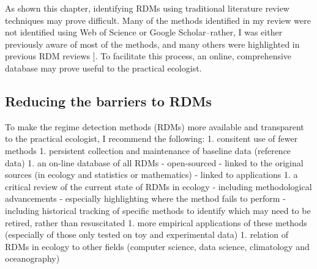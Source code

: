 \documentclass[12pt,twoside,openany]{reedthesis}
\begin{document}
As shown this chapter, identifying RDMs using traditional literature review techniques may prove difficult. Many of the methods identified in my review were not identified using Web of Science or Google Scholar--rather, I was either previously aware of most of the methods, and many others were highlighted in previous RDM reviews {]}. To facilitate this process, an online, comprehensive database may prove useful to the practical ecologist.

\hypertarget{reducing-the-barriers-to-rdms}{%
\subsection{Reducing the barriers to RDMs}\label{reducing-the-barriers-to-rdms}}

To make the regime detection methods (RDMs) more available and transparent to the practical ecologist, I recommend the following:
1. consitent use of fewer methods
1. persistent collection and maintenance of baseline data (reference data)
1. an on-line database of all RDMs
- open-sourced
- linked to the original sources (in ecology and statistics or mathematics)
- linked to applications
1. a critical review of the current state of RDMs in ecology
- including methodological advancements
- especially highlighting where the method fails to perform
- including historical tracking of specific methods to identify which may need to be retired, rather than resuscitated
1. more empirical applications of these methods (especially of those only tested on toy and experimental data)
1. relation of RDMs in ecology to other fields (computer science, data science, climatology and oceanography)
\end{document}
